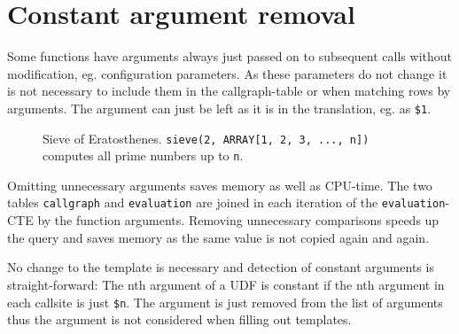 \clearpage

\section{Constant argument removal}

Some functions have arguments always just passed on to subsequent calls without modification, eg. configuration parameters. As these parameters do not change it is not necessary to include them in the callgraph-table or when matching rows by arguments. The argument can just be left as it is in the translation, eg. as \texttt{\$1}.

\begin{figure}[h!]
  \caption{Sieve of Eratosthenes. \texttt{sieve(2, ARRAY[1, 2, 3, ..., n])} computes all prime numbers up to \texttt{n}.}
  \label{lst:sieve_udf}
\end{figure}

Omitting unnecessary arguments saves memory as well as CPU-time. The two tables \texttt{callgraph} and \texttt{evaluation} are joined in each iteration of the \texttt{evaluation}-CTE by the function arguments. Removing unnecessary comparisons speeds up the query and saves memory as the same value is not copied again and again.

No change to the template is necessary and detection of constant arguments is straight-forward: The nth argument of a UDF is constant if the nth argument in each callsite is just \texttt{\$n}. The argument is just removed from the list of arguments thus the argument is not considered when filling out templates.


